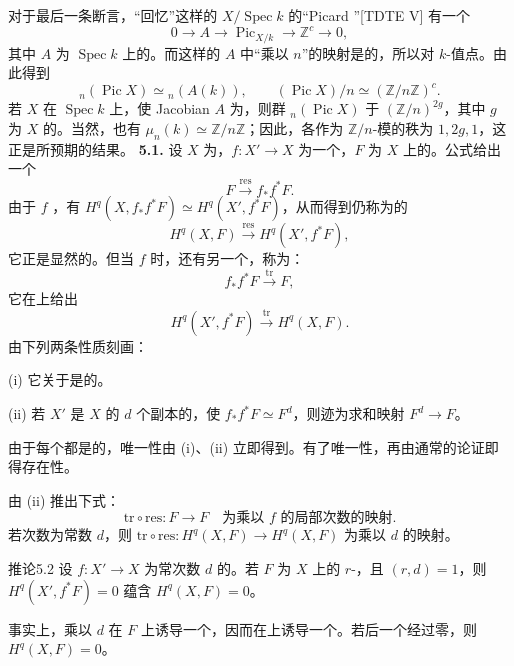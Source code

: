 对于最后一条断言，“回忆”这样的 $X/\operatorname{Spec}k$ 的“Picard ”[TDTE V] 有一个
\[
0\longrightarrow A\longrightarrow\operatorname{Pic}_{X/k}\longrightarrow\mathbb Z^c\longrightarrow0,
\tag{4.8}
\]
其中 $A$ 为 $\operatorname{Spec}k$ 上的。而这样的 $A$ 中“乘以 $n$”的映射是的，所以对 $k$-值点。由此得到
\[
{}_n(\operatorname{Pic}X)\simeq{}_n(A(k)),\qquad
(\operatorname{Pic}X)/n\simeq(\mathbb Z/n\mathbb Z)^c.
\]
若 $X$ 在 $\operatorname{Spec}k$ 上，使 Jacobian $A$ 为，则群 ${}_n(\operatorname{Pic}X)$ 于 $(\mathbb Z/n)^{2g}$，其中 $g$ 为 $X$ 的。当然，也有 $\mu_n(k)\simeq\mathbb Z/n\mathbb Z$；因此，各作为 $\mathbb Z/n$-模的秩为 $1,2g,1$，这正是所预期的结果。
\textbf{5.1.} 设 $X$ 为，$f:X'\to X$ 为一个，$F$ 为 $X$ 上的。公式给出一个
\[
F\xrightarrow{\mathrm{res}}f_*f^*F.
\]
由于 $f$ ，有 $H^q(X,f_*f^*F)\simeq H^q(X',f^*F)$，从而得到仍称为的
\[
H^q(X,F)\xrightarrow{\mathrm{res}}H^q(X',f^*F),
\tag{5.1.1}
\]
它正是显然的。但当 $f$ 时，还有另一个，称为：
\[
f_*f^*F\xrightarrow{\mathrm{tr}}F,
\tag{5.1.2}
\]
它在上给出
\[
H^q(X',f^*F)\xrightarrow{\mathrm{tr}}H^q(X,F).
\tag{5.1.3}
\]
由下列两条性质刻画：

(i) 它关于是的。

(ii) 若 $X'$ 是 $X$ 的 $d$ 个副本的，使 $f_*f^*F\simeq F^d$，则迹为求和映射 $F^d\to F$。

由于每个都是的，唯一性由 (i)、(ii) 立即得到。有了唯一性，再由通常的论证即得存在性。

由 (ii) 推出下式：
\[
\mathrm{tr}\circ\mathrm{res}:F\longrightarrow F\quad
\text{为乘以 }f\text{ 的局部次数的映射}.
\tag{5.1.4}
\]
若次数为常数 $d$，则 $\mathrm{tr}\circ\mathrm{res}:H^q(X,F)\to H^q(X,F)$ 为乘以 $d$ 的映射。
\begin{SGAresult}{推论}{5.2}
设 $f:X'\to X$ 为常次数 $d$ 的。若 $F$ 为 $X$ 上的 $r$-，且 $(r,d)=1$，则 $H^q(X',f^*F)=0$ 蕴含 $H^q(X,F)=0$。
\end{SGAresult}
事实上，乘以 $d$ 在 $F$ 上诱导一个，因而在上诱导一个。若后一个经过零，则 $H^q(X,F)=0$。

